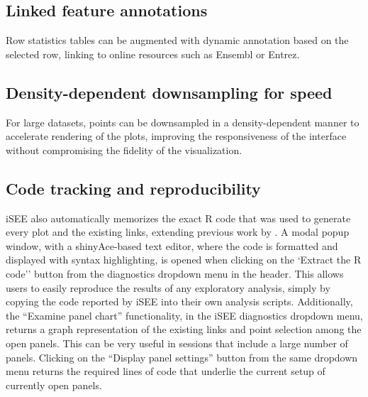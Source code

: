 \documentclass[10pt,a4paper,twocolumn]{article}
\let\cite\citep
\begin{document}
\subsection*{Linked feature annotations}

Row statistics tables can be augmented with dynamic annotation based on the selected row, linking to online resources such as Ensembl or Entrez. %

\subsection*{Density-dependent downsampling for speed}

For large datasets, points can be downsampled in a density-dependent manner to accelerate rendering of the plots, improving the responsiveness of the interface without compromising the fidelity of the visualization.

\subsection*{Code tracking and reproducibility}

iSEE also automatically memorizes the exact R code that was used to generate every plot and the existing links, extending previous work by \cite{marini2016interrepro}. A modal popup window, with a shinyAce-based text editor, where the code is formatted and displayed with syntax highlighting, is opened when clicking on the `Extract the R code'' button from the diagnostics dropdown menu in the header.
This allows users to easily reproduce the results of any exploratory analysis, simply by copying the code reported by iSEE into their own analysis scripts.
Additionally, the ``Examine panel chart'' functionality, in the iSEE diagnostics dropdown menu, returns a graph representation of the existing links and point selection among the open panels. This can be very useful in sessions that include a large number of panels.
Clicking on the ``Display panel settings'' button from the same dropdown menu returns the required lines of code that underlie the current setup of currently open panels.
\end{document}
